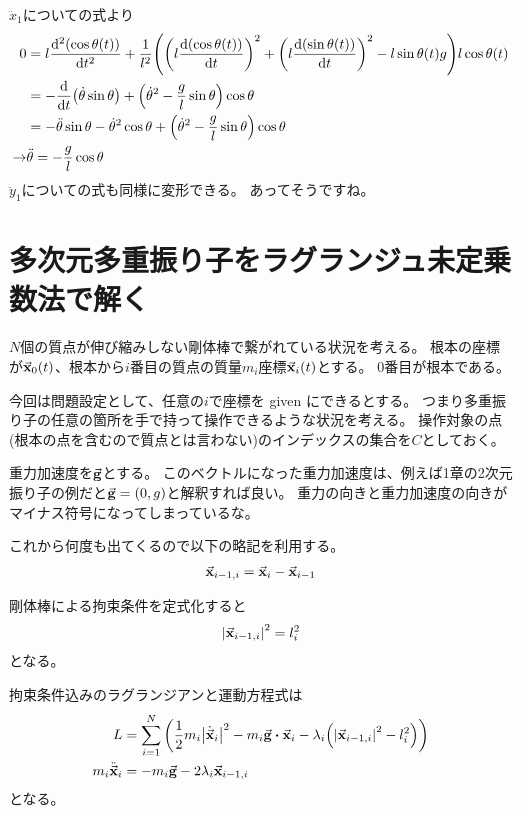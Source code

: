 \documentclass[uplatex]{jsarticle}
\begin{document}
$\ddot{x}_1$についての式より
\begin{align}
    0 &= l\dv[2]{\qty(\cos\theta(t))}{t}
        + \frac{1}{l^2} \qty(
            \qty(l\dv{\qty(\cos\theta(t))}{t})^2 + \qty(l\dv{\qty(\sin\theta(t))}{t})^2
            - l\sin{\theta(t)} g
        ) l\cos{\theta(t)} \nonumber \\
    &= -\dv{}{t}\qty(\dot{\theta}\sin\theta) + \qty(\dot{\theta}^2 - \frac{g}{l}\sin\theta) \cos\theta \nonumber \\
    &= -\ddot{\theta}\sin\theta - \dot{\theta}^2\cos\theta + \qty(\dot{\theta}^2 - \frac{g}{l}\sin\theta) \cos\theta \nonumber \\
    \rightarrow&
    \ddot{\theta} = -\frac{g}{l}\cos\theta
\end{align}
$\ddot{y}_1$についての式も同様に変形できる。
あってそうですね。

\section{多次元多重振り子をラグランジュ未定乗数法で解く}

$N$個の質点が伸び縮みしない剛体棒で繋がれている状況を考える。
根本の座標が$\va{x}_0(t)$、根本から$i$番目の質点の質量$m_i$座標$\va{x}_i(t)$とする。
$0$番目が根本である。

今回は問題設定として、任意の$i$で座標を given にできるとする。
つまり多重振り子の任意の箇所を手で持って操作できるような状況を考える。
操作対象の点(根本の点を含むので質点とは言わない)のインデックスの集合を$C$としておく。

重力加速度を$\va{g}$とする。
このベクトルになった重力加速度は、例えば1章の2次元振り子の例だと$\va{g} = (0, g)$と解釈すれば良い。
重力の向きと重力加速度の向きがマイナス符号になってしまっているな。

これから何度も出てくるので以下の略記を利用する。
\begin{align}
    \va{x}_{i-1,i} = \va{x}_i - \va{x}_{i-1}
\end{align}

剛体棒による拘束条件を定式化すると
\begin{align}
    \abs{\va{x}_{i-1,i}}^2 = l_i^2 \label{nd_mult_cons}
\end{align}
となる。

拘束条件込みのラグランジアンと運動方程式は
\begin{align}
    L &= \sum_{i=1}^N \qty(
        \frac{1}{2} m_i \abs{\dot{\va{x}}_i}^2
        - m_i \va{g} \vdot \va{x}_i
        - \lambda_i \qty(\abs{\va{x}_{i-1,i}}^2 - l_i^2)
    ) \\
    m_i \ddot{\va{x}}_i &= -m_i \va{g} - 2\lambda_i \va{x}_{i-1,i} \label{ng_multi_eom}
\end{align}
となる。
\end{document}
